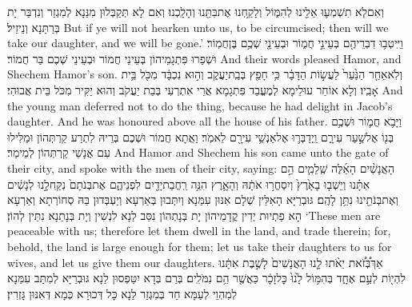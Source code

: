 {וְאִם\maqqaf לֹ֧א תִשְׁמְע֛וּ אֵלֵ֖ינוּ לְהִמּ֑וֹל וְלָקַ֥חְנוּ אֶת\maqqaf בִּתֵּ֖נוּ וְהָלָֽכְנוּ׃}
{וְאִם לָא תְּקַבְּלוּן מִנַּנָא לְמִגְזַר וְנִדְבַּר יָת בְּרַתַּנָא וְנֵיזֵיל׃}
{But if ye will not hearken unto us, to be circumcised; then will we take our daughter, and we will be gone.’}{}
{וַיִּֽיטְב֥וּ דִבְרֵיהֶ֖ם בְּעֵינֵ֣י חֲמ֑וֹר וּבְעֵינֵ֖י שְׁכֶ֥ם בֶּן\maqqaf חֲמֽוֹר׃}
{וּשְׁפַרוּ פִּתְגָמֵיהוֹן בְּעֵינֵי חֲמוֹר וּבְעֵינֵי שְׁכֶם בַּר חֲמוֹר׃}
{And their words pleased Hamor, and Shechem Hamor’s son.}{}
{וְלֹֽא\maqqaf אֵחַ֤ר הַנַּ֙עַר֙ לַעֲשׂ֣וֹת הַדָּבָ֔ר כִּ֥י חָפֵ֖ץ בְּבַֽת\maqqaf יַעֲקֹ֑ב וְה֣וּא נִכְבָּ֔ד מִכֹּ֖ל בֵּ֥ית אָבִֽיו׃}
{וְלָא אוֹחַר עוּלֵימָא לְמֶעֱבַד פִּתְגָמָא אֲרֵי אִתְרְעִי בְּבַת יַעֲקֹב וְהוּא יַקִּיר מִכֹּל בֵּית אֲבוּהִי׃}
{And the young man deferred not to do the thing, because he had delight in Jacob’s daughter. And he was honoured above all the house of his father.}{}
{וַיָּבֹ֥א חֲמ֛וֹר וּשְׁכֶ֥ם בְּנ֖וֹ אֶל\maqqaf שַׁ֣עַר עִירָ֑ם וַֽיְדַבְּר֛וּ אֶל\maqqaf אַנְשֵׁ֥י עִירָ֖ם לֵאמֹֽר׃}
{וַאֲתָא חֲמוֹר וּשְׁכֶם בְּרֵיהּ לִתְרַע קַרְתְּהוֹן וּמַלִּילוּ עִם אֲנָשֵׁי קַרְתְּהוֹן לְמֵימַר׃}
{And Hamor and Shechem his son came unto the gate of their city, and spoke with the men of their city, saying:}{}
{הָאֲנָשִׁ֨ים הָאֵ֜לֶּה שְֽׁלֵמִ֧ים הֵ֣ם אִתָּ֗נוּ וְיֵשְׁב֤וּ בָאָ֙רֶץ֙ וְיִסְחֲר֣וּ אֹתָ֔הּ וְהָאָ֛רֶץ הִנֵּ֥ה רַֽחֲבַת\maqqaf יָדַ֖יִם לִפְנֵיהֶ֑ם אֶת\maqqaf בְּנֹתָם֙ נִקַּֽח\maqqaf לָ֣נוּ לְנָשִׁ֔ים וְאֶת\maqqaf בְּנֹתֵ֖ינוּ נִתֵּ֥ן לָהֶֽם׃}
{גּוּבְרַיָּא הָאִלֵּין שְׁלָם אִנּוּן עִמַּנָא וְיִתְּבוּן בְּאַרְעָא וְיַעְבְּדוּן בַּהּ סְחוֹרְתָא וְאַרְעָא הָא פַתְיוּת יְדִין קֳדָמֵיהוֹן יָת בְּנָתְהוֹן נִסַּב לַנָא לִנְשִׁין וְיָת בְּנָתַנָא נִתֵּין לְהוֹן׃}
{‘These men are peaceable with us; therefore let them dwell in the land, and trade therein; for, behold, the land is large enough for them; let us take their daughters to us for wives, and let us give them our daughters.}{}
{אַךְ\maqqaf בְּ֠זֹ֠את יֵאֹ֨תוּ לָ֤נוּ הָאֲנָשִׁים֙ לָשֶׁ֣בֶת אִתָּ֔נוּ לִהְי֖וֹת לְעַ֣ם אֶחָ֑ד בְּהִמּ֥וֹל לָ֙נוּ֙ כׇּל\maqqaf זָכָ֔ר כַּאֲשֶׁ֖ר הֵ֥ם נִמֹּלִֽים׃}
{בְּרַם בְּדָא יִטַּפְסוּן לַנָא גּוּבְרַיָּא לְמִתַּב עִמַּנָא לְמִהְוֵי לְעַמָּא חַד בְּמִגְזַר לַנָא כָּל דְּכוּרָא כְּמָא דְּאִנּוּן גָּזְרִין׃}

